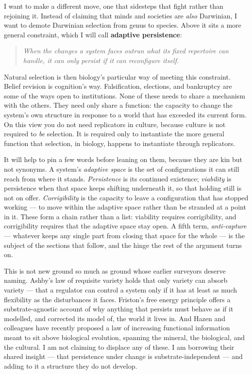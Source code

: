\documentclass[11pt, a4paper]{report}
\begin{document}
I want to make a different move, one that sidesteps that fight rather than rejoining it. Instead of claiming that minds and societies are \textit{also} Darwinian, I want to demote Darwinian selection from genus to species. Above it sits a more general constraint, which I will call \textbf{adaptive persistence}:

\begin{quote}
\textit{When the changes a system faces outrun what its fixed repertoire can handle, it can only persist if it can reconfigure itself.}
\end{quote}

Natural selection is then biology's particular way of meeting this constraint. Belief revision is cognition's way. Falsification, elections, and bankruptcy are some of the ways open to institutions. None of these needs to share a mechanism with the others. They need only share a function: the capacity to change the system's own structure in response to a world that has exceeded its current form. On this view you do not need replicators in culture, because culture is not required to \textit{be} selection. It is required only to instantiate the more general function that selection, in biology, happens to instantiate through replicators.

It will help to pin a few words before leaning on them, because they are kin but not synonyms. A system's \textit{adaptive space} is the set of configurations it can still reach from where it stands. \textit{Persistence} is its continued existence; \textit{viability} is persistence when that space keeps shifting underneath it, so that holding still is not on offer. \textit{Corrigibility} is the capacity to leave a configuration that has stopped working --- to move within the adaptive space rather than be stranded at a point in it. These form a chain rather than a list: viability requires corrigibility, and corrigibility requires that the adaptive space stay open. A fifth term, \textit{anti-capture} --- whatever keeps any single part from closing that space for the whole --- is the subject of the sections that follow, and the hinge the rest of the argument turns on.

This is not new ground so much as ground whose earlier surveyors deserve naming. Ashby's law of requisite variety holds that only variety can absorb variety --- that a regulator can control a system only if it has at least as much flexibility as the disturbances it faces. Friston's free energy principle offers a substrate-agnostic account of why anything that persists must behave as if it modelled, and corrected its model of, the world it lives in. And Hazen and colleagues have recently proposed a law of increasing functional information meant to sit above biological evolution, spanning the mineral, the biological, and the cultural. I am not claiming to displace any of these. I am borrowing their shared insight --- that persistence under change is substrate-independent --- and adding to it a structure they do not develop.
\end{document}

